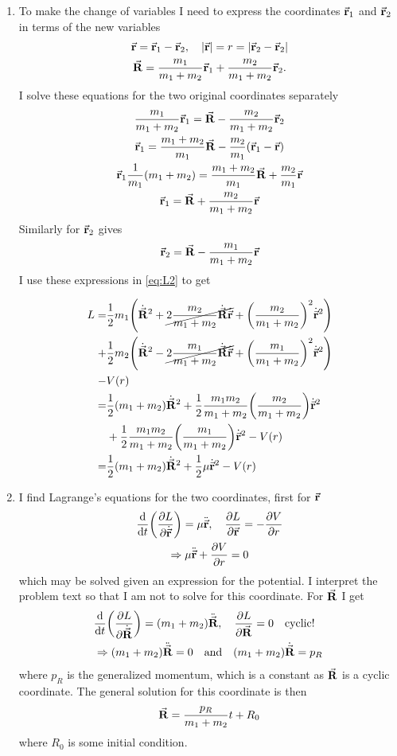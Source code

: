 \documentclass[11pt,a4paper]{report}
\newcounter{excount}[chapter]
\newenvironment{exercise}[1][]{\addtocounter{excount}{1} \noindent {\bf Problem
    \arabic{excount} \ \ #1}\hspace{2mm}}{\vspace{4mm}}
\newcommand{\half}
{
\frac{1}{2}
}
\newcommand{\Lpdv}[1]
{
\pdv{L}{#1}
}
\newcommand{\dvtLpdv}[1]
{
\dv{t} \qty(\Lpdv{#1}) 
}
\newcommand{\dotva}[1]
{
\dot{\va{#1}}
}
\newcommand{\ddotva}[1]
{
\ddot{\va{#1}}
}
\begin{document}
\begin{multicols}{2}
\begin{exercise}
\begin{enumerate}[\bf a)]
\item To make the change of variables I need to express the coordinates $\va{r}_1$ and $\va{r}_2$ in terms of the new variables 
\begin{gather*}
\va{r} = \va{r}_1-\va{r}_2 \qc \abs{\va{r}} = r = \abs{\va{r}_2-\va{r}_2}
\\
\va{R} = \frac{m_1}{m_1+m_2}\va{r}_1 + \frac{m_2}{m_1+m_2}\va{r}_2.
\end{gather*}
I solve these equations for the two original coordinates separately
\begin{gather*}
\frac{m_1}{m_1+m_2}\va{r}_1 = \va{R} -\frac{m_2}{m_1+m_2}\va{r}_2
\\
\va{r}_1 = \frac{m_1+m_2}{m_1}\va{R} -\frac{m_2}{m_1}\qty(\va{r}_1-\va{r})
\\
\va{r}_1\frac{1}{m_1}(m_1+m_2) = \frac{m_1+m_2}{m_1}\va{R} + \frac{m_2}{m_1}\va{r}
\\
\va{r}_1 = \va{R} + \frac{m_2}{m_1+m_2}\va{r}
\end{gather*}
Similarly for $\va{r}_2$ gives
\[\va{r}_2 = \va{R} - \frac{m_1}{m_1+m_2}\va{r}\]
I use these expressions in \cref{eq:L2} to get
\begin{small}
\begin{align*}
L =& \half m_1 \qty(\dot{\va{R}}^2 + \cancel{2 \frac{m_2}{m_1+m_2}\dot{\va{R}}\dot{\va{r}} }+ \qty(\frac{m_2}{m_1+m_2})^2\dot{\va{r}}^2)
\\
+& \half m_2\qty(\dot{\va{R}}^2 - \cancel{2 \frac{m_1}{m_1+m_2}\dot{\va{R}}\dot{\va{r}}} + \qty(\frac{m_1}{m_1+m_2})^2\dot{\va{r}}^2)
\\
-& V(r)
\\
=& \half(m_1+m_2)\dot{\va{R}}^2 + \half \frac{m_1m_2}{m_1+m_2}\qty(\frac{m_2}{m_1+m_2})\dot{\va{r}}^2 
\\
&+ \half \frac{m_1m_2}{m_1+m_2}\qty(\frac{m_1}{m_1+m_2})\dot{\va{r}}^2  -V(r)
\\
=& \half(m_1+m_2)\dot{\va{R}}^2 + \half \mu \dot{\va{r}}^2 -V(r)
\end{align*} \end{small}
\item I find Lagrange's equations for the two coordinates, first for $\va{r}$
\begin{gather*}
\dvtLpdv{\dot{\va{r}}} = \mu \ddotva{r} \qc \Lpdv{\va{r}} = -\pdv{V}{r}
\\
\Rightarrow \mu \ddotva{r} + \pdv{V}{r} = 0
\end{gather*}
which may be solved given an expression for the potential. I interpret the problem text so that I am not to solve for this coordinate. For $\va{R}$ I get
\begin{gather*}
\dvtLpdv{\dotva{R}} = (m_1+m_2) \ddotva{R} \qc \Lpdv{\va{R}} = 0 \qq{cyclic!}
\\
\Rightarrow (m_1+m_2) \ddotva{R} = 0 \qand (m_1+m_2) \dotva{R} = p_R
\end{gather*}
where $p_R$ is the generalized momentum, which is a constant as $\va{R}$ is a cyclic coordinate. The general solution for this coordinate is then
\[ 
\va{R} = \frac{p_R}{m_1+m_2}t + R_0
\]
where $R_0$ is some initial condition.


\end{enumerate}
\end{exercise}
\end{multicols}
\end{document}
